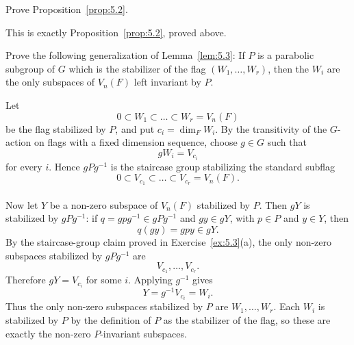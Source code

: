 \documentclass[../Odyssey_Project.tex]{subfiles}
\begin{document}
\begin{exercise}
\label{ex:5.4}
Prove Proposition~\ref{prop:5.2}.
\end{exercise}
\begin{solution}
This is exactly Proposition~\ref{prop:5.2}, proved above.
\end{solution}

\begin{exercise}
\label{ex:5.5}
Prove the following generalization of Lemma~\ref{lem:5.3}: If $P$ is a parabolic subgroup of $G$ which is the stabilizer of the flag $(W_1, \dots, W_r)$, then the $W_i$ are the only subspaces of $V_n(F)$ left invariant by $P$.
\end{exercise}
\begin{solution}
Let
\[
    0\subset W_1\subset \dots \subset W_r=V_n(F)
\]
be the flag stabilized by $P$, and put $c_i=\dim_F W_i$. By the transitivity of the $G$-action on flags with a fixed dimension sequence, choose $g\in G$ such that
\[
    gW_i=V_{c_i}
\]
for every $i$. Hence $gPg^{-1}$ is the staircase group stabilizing the standard subflag
\[
    0\subset V_{c_1}\subset \dots \subset V_{c_r}=V_n(F).
\]\\
Now let $Y$ be a non-zero subspace of $V_n(F)$ stabilized by $P$. Then $gY$ is stabilized by $gPg^{-1}$: if $q=gpg^{-1}\in gPg^{-1}$ and $gy\in gY$, with $p\in P$ and $y\in Y$, then
\[
    q(gy)=gpy\in gY.
\]
By the staircase-group claim proved in Exercise~\ref{ex:5.3}(a), the only non-zero subspaces stabilized by $gPg^{-1}$ are
\[
    V_{c_1},\dots,V_{c_r}.
\]
Therefore $gY=V_{c_i}$ for some $i$. Applying $g^{-1}$ gives
\[
    Y=g^{-1}V_{c_i}=W_i.
\]
Thus the only non-zero subspaces stabilized by $P$ are $W_1,\dots,W_r$. Each $W_i$ is stabilized by $P$ by the definition of $P$ as the stabilizer of the flag, so these are exactly the non-zero $P$-invariant subspaces.
\end{solution}
\end{document}
